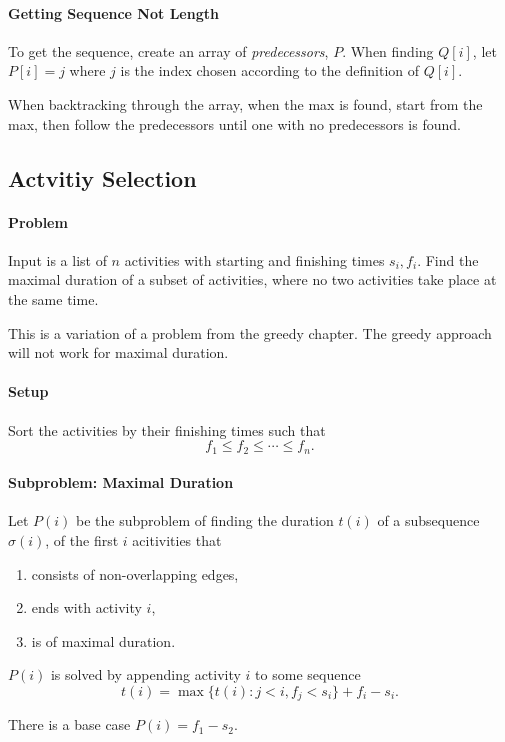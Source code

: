 \paragraph{Getting Sequence Not Length}
To get the sequence, create an array of \textit{predecessors}, \(P\).
When finding \(Q[i]\), let  \(P[i] = j\) where  \(j\)
is the index chosen according to the definition of \(Q[i]\).

When backtracking through the array, when the max is found, start from
the max, then follow the predecessors until one with no predecessors is found.

\subsection{Actvitiy Selection}
\paragraph{Problem}
Input is a list of \(n\) activities with starting and finishing times  \(s_i, f_i\). 
Find the maximal duration of a subset of activities, where no two activities
take place at the same time.

This is a variation of a problem from the greedy chapter.
The greedy approach will not work for maximal duration.

\paragraph{Setup}
Sort the activities by their finishing times such that \[
  f_1 \leq f_2 \leq \cdots \leq f_n
.\] 

\paragraph{Subproblem: Maximal Duration}
Let \(P(i)\) be the subproblem of finding the duration \(t(i)\)
of a subsequence  \(\sigma(i)\), of the first  \(i\) acitivities that
 \begin{enumerate}
  \item consists of non-overlapping edges,
  \item ends with activity \(i\), 
  \item is of maximal duration.
\end{enumerate}

\(P(i)\) is solved by appending  activity \(i\) to some sequence \[
  t(i) = \max \{
    t(i) : j < i, f_j < s_i
  \}  + f_i - s_i
.\] 

There is a base case \(P(i) = f_1 - s_2\).

